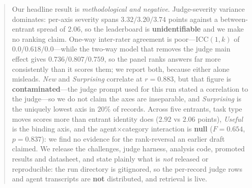\begin{abstract}
Our headline result is \emph{methodological and negative}. Judge-severity variance dominates: per-axis severity spans $3.32/3.20/3.74$ points against a between-entrant spread of $2.06$, so the leaderboard is \textbf{unidentifiable} and we make no ranking claim. One-way inter-rater agreement is poor---$\mathrm{ICC}(1,k)$ of $0.0/0.618/0.0$---while the two-way model that removes the judge main effect gives $0.736/0.807/0.759$, so the panel ranks answers far more consistently than it scores them; we report both, because either alone misleads. \emph{New} and \emph{Surprising} correlate at $r=0.883$, but that figure is \textbf{contaminated}---the judge prompt used for this run stated a correlation to the judge---so we do not claim the axes are inseparable, and \emph{Surprising} is the uniquely lowest axis in $20\%$ of records. Across five entrants, task type moves scores more than entrant identity does ($2.92$ vs $2.06$ points), \emph{Useful} is the binding axis, and the agent$\times$category interaction is \textbf{null} ($F=0.654$, $p=0.837$): we find no evidence for the rank-reversal an earlier draft claimed. We release the challenges, judge harness, analysis code, promoted results and datasheet, and state plainly what is \emph{not} released or reproducible: the run directory is gitignored, so the per-record judge rows and agent transcripts are \textbf{not} distributed, and retrieval is live.
\end{abstract}
